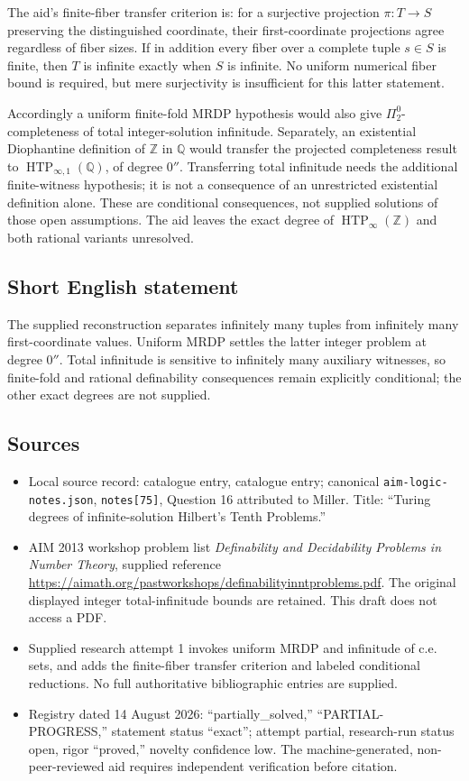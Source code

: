 \documentclass[11pt]{article}
\begin{document}
The aid's finite-fiber transfer criterion is: for a surjective projection \(\pi:T\to S\) preserving the distinguished coordinate, their first-coordinate projections agree regardless of fiber sizes. If in addition every fiber over a complete tuple \(s\in S\) is finite, then \(T\) is infinite exactly when \(S\) is infinite. No uniform numerical fiber bound is required, but mere surjectivity is insufficient for this latter statement.

Accordingly a uniform finite-fold MRDP hypothesis would also give \(\Pi^0_2\)-completeness of total integer-solution infinitude. Separately, an existential Diophantine definition of \(\mathbb Z\) in \(\mathbb Q\) would transfer the projected completeness result to \(\operatorname{HTP}_{\infty,1}(\mathbb Q)\), of degree \(0''\). Transferring total infinitude needs the additional finite-witness hypothesis; it is not a consequence of an unrestricted existential definition alone. These are conditional consequences, not supplied solutions of those open assumptions. The aid leaves the exact degree of \(\operatorname{HTP}_\infty(\mathbb Z)\) and both rational variants unresolved.
\subsection{Short English statement}
The supplied reconstruction separates infinitely many tuples from infinitely many first-coordinate values. Uniform MRDP settles the latter integer problem at degree \(0''\). Total infinitude is sensitive to infinitely many auxiliary witnesses, so finite-fold and rational definability consequences remain explicitly conditional; the other exact degrees are not supplied.
\subsection{Sources}
\begin{itemize}
\item Local source record: catalogue entry, catalogue entry; canonical \texttt{aim-logic-notes.json}, \texttt{notes[75]}, Question 16 attributed to Miller. Title: ``Turing degrees of infinite-solution Hilbert's Tenth Problems.''
\item AIM 2013 workshop problem list \emph{Definability and Decidability Problems in Number Theory}, supplied reference \url{https://aimath.org/pastworkshops/definabilityinntproblems.pdf}. The original displayed integer total-infinitude bounds are retained. This draft does not access a PDF.
\item Supplied research attempt 1 invokes uniform MRDP and infinitude of c.e. sets, and adds the finite-fiber transfer criterion and labeled conditional reductions. No full authoritative bibliographic entries are supplied.
\item Registry dated 14 August 2026: ``partially\_solved,'' ``PARTIAL-PROGRESS,'' statement status ``exact''; attempt partial, research-run status open, rigor ``proved,'' novelty confidence low. The machine-generated, non-peer-reviewed aid requires independent verification before citation.
\end{itemize}
\end{document}
